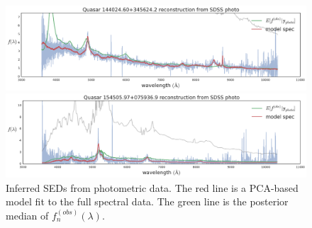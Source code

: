 \documentclass{article}
\begin{document}
\begin{figure}[th]
\vskip 0.2in
\begin{center}
\centerline{\includegraphics[width=2\columnwidth]{../figs/quasar_plots/quasar_56_mcmc_recon.pdf}} 
\centerline{\includegraphics[width=2\columnwidth]{../figs/quasar_plots/quasar_119_mcmc_recon.pdf}} 
\vskip -0.2in
\caption{Inferred SEDs from photometric data.  The red line is a PCA-based model fit to the full spectral data.  The green line is the posterior median of $f^{(obs)}_n(\lambda)$. }
\label{fig:recon}
\end{center}
\end{figure}
\end{document}
